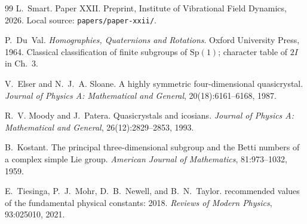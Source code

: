 \documentclass[12pt]{article}
\theoremstyle{definition}
\theoremstyle{remark}
\begin{document}
\begin{thebibliography}{99}
L.~Smart.
\newblock Paper {XXII}.
\newblock Preprint, Institute of Vibrational Field Dynamics, 2026.
\newblock Local source: \texttt{papers/paper-xxii/}.

P.~Du~Val.
\newblock \emph{Homographies, Quaternions and Rotations}.
\newblock Oxford University Press, 1964.
\newblock Classical classification of finite subgroups of $\mathrm{Sp}(1)$; character table of $2I$ in Ch.~3.

V.~Elser and N.~J.~A. Sloane.
\newblock A highly symmetric four-dimensional quasicrystal.
\newblock \emph{Journal of Physics A: Mathematical and General}, 20(18):6161--6168, 1987.

R.~V. Moody and J.~Patera.
\newblock Quasicrystals and icosians.
\newblock \emph{Journal of Physics A: Mathematical and General}, 26(12):2829--2853, 1993.

B.~Kostant.
\newblock The principal three-dimensional subgroup and the {Betti} numbers of a complex simple {Lie} group.
\newblock \emph{American Journal of Mathematics}, 81:973--1032, 1959.

E.~Tiesinga, P.~J.~Mohr, D.~B.~Newell, and B.~N.~Taylor.
 recommended values of the fundamental physical constants: 2018.
\newblock \emph{Reviews of Modern Physics}, 93:025010, 2021.

\end{thebibliography}
\end{document}
